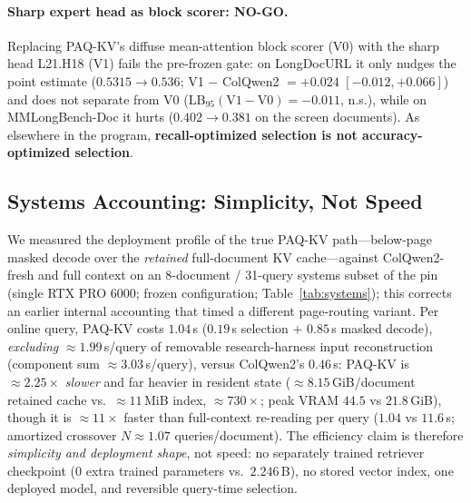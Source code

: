 \documentclass[letterpaper]{article} %
\newcommand{\paqc}{\textsc{PAQ-KV}}
\newcommand{\lb}{\mathrm{LB}_{95}}
\begin{document}
\paragraph{Sharp expert head as block scorer: NO-GO.} Replacing \paqc{}'s diffuse mean-attention block scorer (V0) with the sharp head L21.H18 (V1) fails the pre-frozen gate: on LongDocURL it only nudges the point estimate ($0.5315 \to 0.536$; V1 $-$ ColQwen2 $= +0.024$ $[-0.012,+0.066]$) and does not separate from V0 ($\lb(\mathrm{V1}-\mathrm{V0}) = -0.011$, n.s.), while on MMLongBench-Doc it hurts ($0.402 \to 0.381$ on the screen documents). As elsewhere in the program, \textbf{recall-optimized selection is not accuracy-optimized selection}.

\subsection{Systems Accounting: Simplicity, Not Speed}\label{sec:results-efficiency}
We measured the deployment profile of the true \paqc{} path---below-page masked decode over the \emph{retained} full-document KV cache---against ColQwen2-fresh and full context on an 8-document / 31-query systems subset of the pin (single RTX PRO 6000; frozen configuration; Table~\ref{tab:systems}); this corrects an earlier internal accounting that timed a different page-routing variant. Per online query, \paqc{} costs $1.04$\,s ($0.19$\,s selection $+$ $0.85$\,s masked decode), \emph{excluding} ${\approx}1.99$\,s/query of removable research-harness input reconstruction (component sum ${\approx}3.03$\,s/query), versus ColQwen2's $0.46$\,s: \paqc{} is ${\approx}2.25\times$ \emph{slower} and far heavier in resident state (${\approx}8.15$\,GiB/document retained cache vs.\ ${\approx}11$\,MiB index, ${\approx}730\times$; peak VRAM $44.5$ vs $21.8$\,GiB), though it is ${\approx}11\times$ faster than full-context re-reading per query ($1.04$ vs $11.6$\,s; amortized crossover $N{\approx}1.07$ queries/document). The efficiency claim is therefore \emph{simplicity and deployment shape}, not speed: no separately trained retriever checkpoint ($0$ extra trained parameters vs.\ $2.246$\,B), no stored vector index, one deployed model, and reversible query-time selection.
\end{document}
